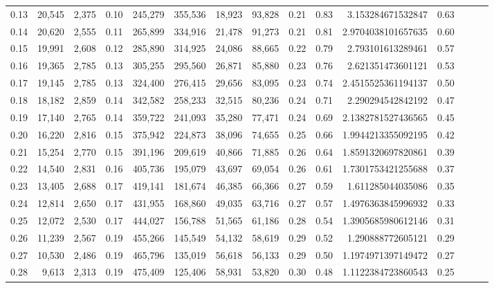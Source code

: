 \begin{tabular}{rrrrrrrrrrrrrrr}
0.13 &  20,545 &  2,375 &  0.10 &  245,279 &  355,536 &   18,923 &   93,828 &  0.21 &  0.83 &     3.153284671532847 &      0.63 \\
0.14 &  20,620 &  2,555 &  0.11 &  265,899 &  334,916 &   21,478 &   91,273 &  0.21 &  0.81 &    2.9704038101657635 &      0.60 \\
0.15 &  19,991 &  2,608 &  0.12 &  285,890 &  314,925 &   24,086 &   88,665 &  0.22 &  0.79 &     2.793101613289461 &      0.57 \\
0.16 &  19,365 &  2,785 &  0.13 &  305,255 &  295,560 &   26,871 &   85,880 &  0.23 &  0.76 &     2.621351473601121 &      0.53 \\
0.17 &  19,145 &  2,785 &  0.13 &  324,400 &  276,415 &   29,656 &   83,095 &  0.23 &  0.74 &    2.4515525361194137 &      0.50 \\
0.18 &  18,182 &  2,859 &  0.14 &  342,582 &  258,233 &   32,515 &   80,236 &  0.24 &  0.71 &     2.290294542842192 &      0.47 \\
0.19 &  17,140 &  2,765 &  0.14 &  359,722 &  241,093 &   35,280 &   77,471 &  0.24 &  0.69 &    2.1382781527436565 &      0.45 \\
0.20 &  16,220 &  2,816 &  0.15 &  375,942 &  224,873 &   38,096 &   74,655 &  0.25 &  0.66 &    1.9944213355092195 &      0.42 \\
0.21 &  15,254 &  2,770 &  0.15 &  391,196 &  209,619 &   40,866 &   71,885 &  0.26 &  0.64 &    1.8591320697820861 &      0.39 \\
0.22 &  14,540 &  2,831 &  0.16 &  405,736 &  195,079 &   43,697 &   69,054 &  0.26 &  0.61 &    1.7301753421255688 &      0.37 \\
0.23 &  13,405 &  2,688 &  0.17 &  419,141 &  181,674 &   46,385 &   66,366 &  0.27 &  0.59 &     1.611285044035086 &      0.35 \\
0.24 &  12,814 &  2,650 &  0.17 &  431,955 &  168,860 &   49,035 &   63,716 &  0.27 &  0.57 &    1.4976363845996932 &      0.33 \\
0.25 &  12,072 &  2,530 &  0.17 &  444,027 &  156,788 &   51,565 &   61,186 &  0.28 &  0.54 &    1.3905685980612146 &      0.31 \\
0.26 &  11,239 &  2,567 &  0.19 &  455,266 &  145,549 &   54,132 &   58,619 &  0.29 &  0.52 &     1.290888772605121 &      0.29 \\
0.27 &  10,530 &  2,486 &  0.19 &  465,796 &  135,019 &   56,618 &   56,133 &  0.29 &  0.50 &    1.1974971397149472 &      0.27 \\
0.28 &   9,613 &  2,313 &  0.19 &  475,409 &  125,406 &   58,931 &   53,820 &  0.30 &  0.48 &    1.1122384723860543 &      0.25 \\

\end{tabular}
